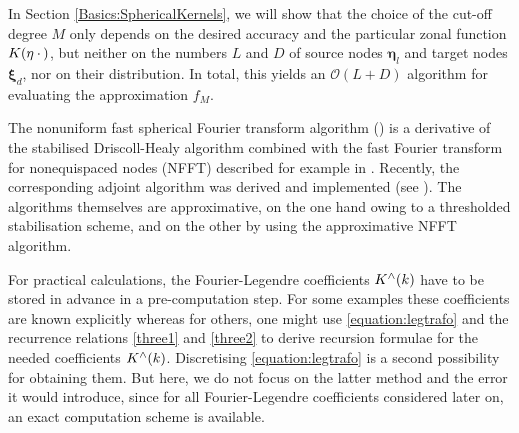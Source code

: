 \documentclass[11pt,a4paper,twoside,bibtotoc]{scrartcl}
\theoremstyle{plain}
\theoremstyle{definition}
\theoremstyle{remark}
\newcommand{\fun}[2]{\ensuremath{#1{\hspace{-0.4ex}}\left(#2\right)}}
\numberwithin{equation}{section}
\numberwithin{table}{section}
\numberwithin{figure}{section}
\begin{document}
In Section \ref{Basics:SphericalKernels}, we will show that the choice 
of the cut-off degree $M$ only depends on the desired accuracy
and the particular zonal function $\fun{K}{\mathbf{\eta} \: \cdot \,}$, but neither
on the numbers $L$ and $D$ of source nodes $\mathbf{\eta}_{l}$ and target nodes 
$\mathbf{\xi}_{d}$, nor on their distribution.
In total, this yields an $\mathcal{O}\left(L + D\right)$ algorithm for evaluating the 
approximation $f_{M}$.

The nonuniform fast spherical Fourier transform algorithm (\cite{kupo02}) is 
a derivative of the stabilised Driscoll-Healy algorithm \cite{drhe,postta97}
combined with the fast Fourier transform for nonequispaced nodes (NFFT)
described for example in \cite{postta01}. Recently, the corresponding adjoint 
algorithm was derived and implemented (see \cite{keiner05}). The algorithms 
themselves are approximative, on the one hand owing to a thresholded 
stabilisation scheme, and on the other by using the approximative
NFFT algorithm.

For practical calculations, the Fourier-Legendre coefficients 
$\fun{K^{\wedge}}{k}$ have to be stored in advance in a pre-computation step. 
For some examples these coefficients are known explicitly whereas for others, one might use \eqref{equation:legtrafo}
and the recurrence relations \eqref{three1} and \eqref{three2} to derive
recursion formulae for the needed coefficients $\fun{K^{\wedge}}{k}$.
Discretising \eqref{equation:legtrafo} is a second possibility for obtaining them.
But here, we do not focus on the latter method and the error it would introduce, since for all Fourier-Legendre coefficients considered later on, an exact computation scheme is available.
\end{document}
